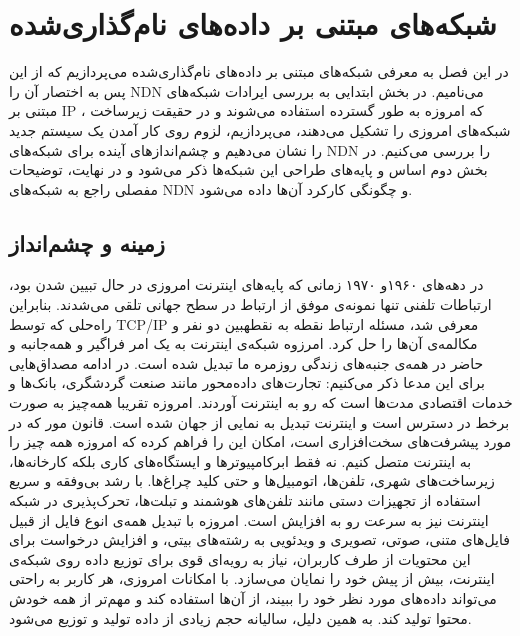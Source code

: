 

\chapter{ شبکه‌های مبتنی بر داده‌های نام‌گذاری‌شده}

در این فصل به معرفی شبکه‌های مبتنی بر داده‌های نام‌گذاری‌شده می‌پردازیم که از این پس به اختصار آن‌ را  NDN می‌نامیم.  در بخش ابتدایی به بررسی ایرادات شبکه‌های مبتنی بر IP ، که امروزه به طور گسترده استفاده می‌شوند و در حقیقت زیرساخت شبکه‌های امروزی را تشکیل می‌دهند، می‌پردازیم، لزوم روی کار آمدن یک سیستم جدید را نشان می‌دهیم و چشم‌اندازهای آینده برای شبکه‌های NDN را بررسی می‌کنیم. در بخش دوم اساس و پایه‌های طراحی این شبکه‌ها ذکر می‌شود و در نهایت، توضیحات مفصلی راجع به شبکه‌های NDN و چگونگی کارکرد آن‌ها داده می‌شود. 

\section{زمینه و چشم‌انداز}

در دهه‌‌های ۱۹۶۰و ۱۹۷۰ زمانی که پایه‌‌های اینترنت امروزی در حال تبیین شدن بود، ارتباطات تلفنی تنها نمونه‌ی موفق از ارتباط در سطح جهانی تلقی می‌شدند. بنابراین راه‌حلی که توسط TCP/IP معرفی شد، مسئله ارتباط نقطه به نقطهبین دو نفر و مکالمه‌ی آن‌ها را حل کرد.  
امرزوه شبکه‌ی اینترنت به یک امر فراگیر و همه‌جانبه و حاضر در همه‌ی جنبه‌های زندگی روزمره ما تبدیل شده است. در ادامه مصداق‌‌هایی برای این مدعا ذکر می‌کنیم:‌
  تجارت‌های داده‌محور مانند صنعت گردشگری، بانک‌ها و خدمات اقتصادی مدت‌ها است که رو به اینترنت آوردند. امروزه تقریبا همه‌چیز به صورت برخط در دسترس است و اینترنت تبدیل به نمایی از جهان شده است. 
 قانون مور که در مورد پیشرفت‌های سخت‌افزاری است، امکان این را فراهم کرده که امروزه همه‌ چیز را به اینترنت متصل کنیم. نه فقط ابرکامپیوترها و ایستگاه‌‌های کاری  بلکه کارخانه‌ها، زیرساخت‌های شهری، تلفن‌ها، اتومبیل‌ها و حتی کلید چراغ‌‌ها. با رشد بی‌وفقه و سریع استفاده از تجهیزات دستی مانند تلفن‌های هوشمند و  تبلت‌ها، تحرک‌پذیری در شبکه اینترنت نیز به سرعت رو به افزایش است. 
 امروزه با تبدیل همه‌ی انوع فایل از قبیل فایل‌‌های متنی، صوتی، تصویری و ویدئویی به رشته‌های بیتی، و افزایش درخواست برای این محتویات از طرف کاربران، نیاز به رویه‌ای قوی برای توزیع داده روی شبکه‌ی اینترنت، بیش از پیش خود را نمایان می‌سازد.
 با امکانات امروزی، هر کاربر به راحتی می‌تواند داده‌های مورد نظر خود را ببیند، از آن‌ها استفاده کند و مهم‌تر از همه خودش محتوا تولید کند. به همین دلیل، سالیانه حجم زیادی از داده تولید و توزیع می‌شود.    

